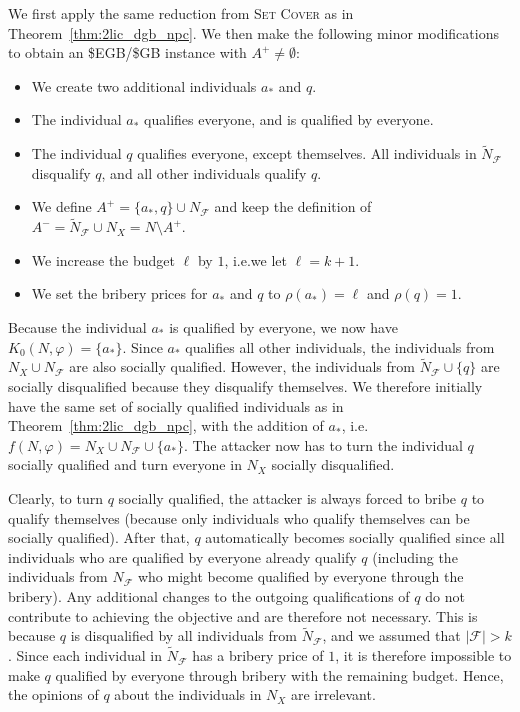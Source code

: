 \documentclass[
    12pt,               %
    a4paper,            %
    bibtotoc,           %
    pointlessnumbers,   %
    ngerman,            %
    titlepage,          %
    leqno,              %
    ]{scrarticle}       %
\newcommand\thmref{Theorem~\ref}
\begin{document}
\begin{Proof}
We first apply the same reduction from \textsc{Set Cover} as in \thmref{thm:2lic_dgb_npc}. We then make the following minor modifications to obtain an \$EGB/\$GB instance with $A^+ \neq \emptyset$:

\begin{itemize}[nolistsep]
\item
We create two additional individuals $a_\ast$ and $q$.
\item
The individual $a_\ast$ qualifies everyone, and is qualified by everyone.
\item
The individual $q$ qualifies everyone, except themselves. All individuals in $\tilde{N}_\mathcal{F}$ disqualify $q$, and all other individuals qualify $q$.
\item
We define $A^+ = \{ a_\ast, q \} \cup N_\mathcal{F}$ and keep the definition of $A^- = \tilde{N}_\mathcal{F} \cup N_X = N \setminus A^+$.
\item
We increase the budget $\ell$ by $1$, i.e.\@ we let $\ell = k+1$.
\item
We set the bribery prices for $a_\ast$ and $q$ to $\rho(a_\ast) = \ell$ and $\rho(q) = 1$.
\end{itemize}

Because the individual $a_\ast$ is qualified by everyone, we now have $K_0(N, \varphi) = \{a_\ast\}$. Since $a_\ast$ qualifies all other individuals, the individuals from $N_X \cup N_\mathcal{F}$ are also socially qualified. However, the individuals from $\tilde{N}_\mathcal{F} \cup \{q\}$ are socially disqualified because they disqualify themselves. We therefore initially have the same set of socially qualified individuals as in \thmref{thm:2lic_dgb_npc}, with the addition of $a_\ast$, i.e.\@ $f(N, \varphi) = N_X \cup N_\mathcal{F} \cup \{a_\ast\}$. The attacker now has to turn the individual $q$ socially qualified and turn everyone in $N_X$ socially disqualified.

Clearly, to turn $q$ socially qualified, the attacker is always forced to bribe $q$ to qualify themselves (because only individuals who qualify themselves can be socially qualified). After that, $q$ automatically becomes socially qualified since all individuals who are qualified by everyone already qualify $q$ (including the individuals from $N_\mathcal{F}$ who might become qualified by everyone through the bribery). Any additional changes to the outgoing qualifications of $q$ do not contribute to achieving the objective and are therefore not necessary. This is because $q$ is disqualified by all individuals from $\tilde{N}_\mathcal{F}$, and we assumed that $|\mathcal{F}| > k$. Since each individual in $\tilde{N}_\mathcal{F}$ has a bribery price of $1$, it is therefore impossible to make $q$ qualified by everyone through bribery with the remaining budget. Hence, the opinions of $q$ about the individuals in $N_X$ are irrelevant.


\end{Proof}
\end{document}
